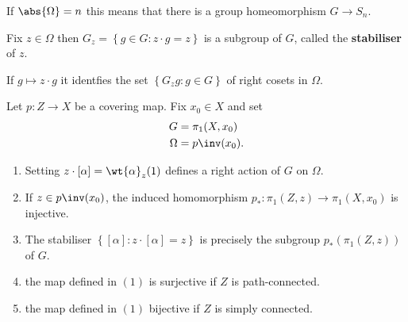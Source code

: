 \documentclass[12pt, a4paper]{article}
\begin{document}
\begin{mdremark}
    If \(\abs{\Omega}=n\) this means that there is a group homeomorphism \(G \to S_n\).
\end{mdremark}

\begin{definition}
    Fix \(z \in \Omega\) then \(G_z = \left\{ g\in G :z\cdot g =z \right\}\) is a subgroup of \(G\), called the \textbf{stabiliser} of \(z\). 
\end{definition}

\begin{lemma}
    If \(g \mapsto z\cdot g\) it identfies the set \(\left\{ G_zg :g \in G \right\}\) of right cosets in \(\Omega\).
\end{lemma}

\begin{mdthm}
    Let \(p:Z \to X\) be a covering map. Fix \(x_0 \in X\) and set 
    \[\begin{aligned}
        G &= \pi_1(X,x_0) \\
        \Omega &= p\inv(x_0).
    \end{aligned}\]
    \begin{enumerate}
        \item Setting \(z\cdot [\alpha]=\wt{\alpha}_z(1)\) defines a right action of \(G\) on \(\Omega\).
        \item If \(z \in p\inv(x_0)\), the induced homomorphism \(p_*:\pi_1(Z,z) \to \pi_1(X,x_0)\) is injective.
        \item The stabiliser \(\left\{ [\alpha] : z\cdot [\alpha]=z \right\}\) is precisely the subgroup \(p_*(\pi_1(Z,z))\) of \(G\).
        \item the map defined in \((1)\) is surjective if \(Z\) is path-connected.
        \item the map defined in \((1)\) bijective if \(Z\) is simply connected.
    \end{enumerate}
\end{mdthm}
\end{document}

